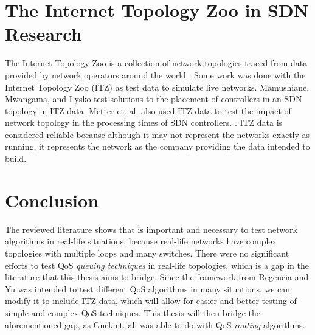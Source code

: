 \section{The Internet Topology Zoo in SDN Research}
The Internet Topology Zoo is a collection of network topologies traced from data provided by network operators around the world \cite{knight_internet_2011}. Some work was done with the Internet Topology Zoo (ITZ) as test data to simulate live networks. Mamushiane, Mwangama, and Lysko \cite{mamushiane_given_2018} test solutions to the placement of controllers in an SDN topology in ITZ data. Metter et. al. also used ITZ data to test the impact of network topology in the processing times of SDN controllers. \cite{metter_investigating_2015}. ITZ data is considered reliable because although it may not represent the networks exactly as running, it represents the network as the company providing the data intended to build. \cite{knight_internet_2011}

\section{Conclusion}
The reviewed literature shows that is important and necessary to test network algorithms in real-life situations, because real-life networks have complex topologies with multiple loops and many switches. There were no significant efforts to test QoS \textit{queuing techniques} in real-life topologies, which is a gap in the literature that this thesis aims to bridge. Since the framework from Regencia and Yu was intended to test different QoS algorithms in many situations, we can modify it to include ITZ data, which will allow for easier and better testing of simple and complex QoS techniques. This thesis will then bridge the aforementioned gap, as Guck et. al. \cite{guck_unicast_2018} was able to do with QoS \textit{routing} algorithms.


